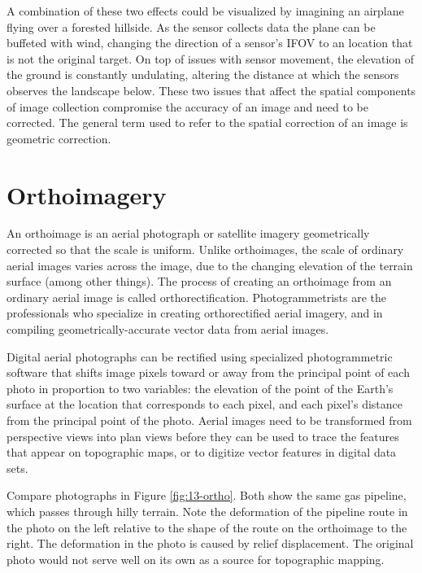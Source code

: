 \documentclass[
]{book}
\begin{document}
A combination of these two effects could be visualized by imagining an
airplane flying over a forested hillside. As the sensor collects data
the plane can be buffeted with wind, changing the direction of a
sensor's IFOV to an location that is not the original target. On top of
issues with sensor movement, the elevation of the ground is constantly
undulating, altering the distance at which the sensors observes the
landscape below. These two issues that affect the spatial components of
image collection compromise the accuracy of an image and need to be
corrected. The general term used to refer to the spatial correction of
an image is geometric correction.

\hypertarget{orthoimagery}{%
\section{Orthoimagery}\label{orthoimagery}}

An orthoimage is an aerial photograph or satellite imagery geometrically
corrected so that the scale is uniform. Unlike orthoimages, the scale of
ordinary aerial images varies across the image, due to the changing
elevation of the terrain surface (among other things). The process of
creating an orthoimage from an ordinary aerial image is called
orthorectification. Photogrammetrists are the professionals who
specialize in creating orthorectified aerial imagery, and in compiling
geometrically-accurate vector data from aerial images.

Digital aerial photographs can be rectified using specialized
photogrammetric software that shifts image pixels toward or away from
the principal point of each photo in proportion to two variables: the
elevation of the point of the Earth's surface at the location that
corresponds to each pixel, and each pixel's distance from the principal
point of the photo. Aerial images need to be transformed from
perspective views into plan views before they can be used to trace the
features that appear on topographic maps, or to digitize vector features
in digital data sets.

Compare photographs in Figure \ref{fig:13-ortho}. Both show the same
gas pipeline, which passes through hilly terrain. Note the deformation
of the pipeline route in the photo on the left relative to the shape of
the route on the orthoimage to the right. The deformation in the photo
is caused by relief displacement. The original photo would not serve
well on its own as a source for topographic mapping.
\end{document}
